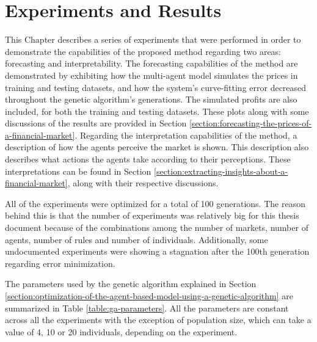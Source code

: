 \chapter{Experiments and Results}
\label{chapter:experiments-and-results}

This Chapter describes a series of experiments that were performed in order to
demonstrate the capabilities of the proposed method regarding two areas:
forecasting and interpretability. The forecasting capabilities of the method are
demonstrated by exhibiting how the multi-agent model simulates the prices in
training and testing datasets, and how the system's curve-fitting error
decreased throughout the genetic algorithm's generations. The simulated profits
are also included, for both the training and testing datasets. These plots along
with some discussions of the results are provided in Section
\ref{section:forecasting-the-prices-of-a-financial-market}. Regarding the
interpretation capabilities of the method, a description of how the agents
perceive the market is shown. This description also describes what actions the
agents take according to their perceptions. These interpretations can be found
in Section \ref{section:extracting-insights-about-a-financial-market}, along
with their respective discussions.

All of the experiments were optimized for a total of 100 generations. The reason
behind this is that the number of experiments was relatively big for this
thesis document because of the combinations among the number of markets, number
of agents, number of rules and number of individuals. Additionally, some
undocumented experiments were showing a stagnation after the 100th generation
regarding error minimization.



The parameters used by the genetic algorithm explained in Section \ref{section:optimization-of-the-agent-based-model-using-a-genetic-algorithm} are summarized in Table \ref{table:ga-parameters}. All the parameters are constant across all the experiments with the exception of population size, which can take a value of 4, 10 or 20 individuals, depending on the experiment.

